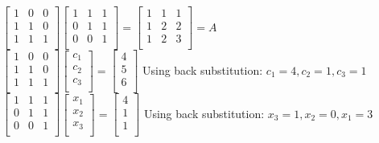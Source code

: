 \documentclass[10pt,twoside,reqno]{article}
\begin{document}
\vspace{3mm}
$
$$
\begin{bmatrix}
1&0&0\\
1&1&0\\
1&1&1\\
\end{bmatrix}
\begin{bmatrix}
1&1&1\\
0&1&1\\
0&0&1\\
\end{bmatrix}
=
\begin{bmatrix}
1&1&1\\
1&2&2\\
1&2&3\\
\end{bmatrix}
=A
$$
$\\
\vspace{3mm}
$
$$
\begin{bmatrix}
1&0&0\\
1&1&0\\
1&1&1\\
\end{bmatrix}
\begin{bmatrix}
c_1\\
c_2\\
c_3\\
\end{bmatrix}
=
\begin{bmatrix}
4\\
5\\
6\\
\end{bmatrix}
$$
$
Using back substitution: $c_1 = 4, c_2 = 1, c_3 = 1$\\
\vspace{3mm}
$
$$
\begin{bmatrix}
1&1&1\\
0&1&1\\
0&0&1\\
\end{bmatrix}
\begin{bmatrix}
x_1\\
x_2\\
x_3\\
\end{bmatrix}
=
\begin{bmatrix}
4\\
1\\
1\\
\end{bmatrix}
$$
$
Using back substitution: $x_3 = 1, x_2 = 0, x_1 = 3$\\
\end{document}
